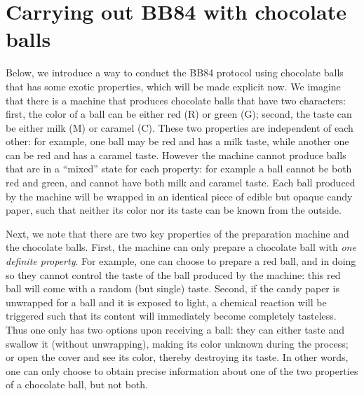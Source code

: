 \documentclass{article}
\begin{document}
\section{Carrying out BB84 with chocolate balls}
Below, we introduce a way to conduct the BB84 protocol using chocolate balls that has some exotic properties, which will be made explicit now. 
We imagine that there is a machine that produces chocolate balls that have two characters: first, the color of a ball can be either red (R) or green (G); second, the taste can be either milk (M) or caramel (C).
These two properties are independent of each other: for example, one ball may be red and has a milk taste, while another one can be red and has a caramel taste.
However the machine cannot produce balls that are in a ``mixed'' state for each property: for example a ball cannot be both red and green, and cannot have both milk and caramel taste.
Each ball produced by the machine will be wrapped in an identical piece of edible but opaque candy paper, such that neither its color nor its taste can be known from the outside.

Next, we note that there are two key properties of the preparation machine and the chocolate balls.
First, the machine can only prepare a chocolate ball with \textit{one definite property}.
For example, one can choose to prepare a red ball, and in doing so they cannot control the taste of the ball produced by the machine: this red ball will come with a random (but single) taste.
Second, if the candy paper is unwrapped for a ball and it is exposed to light, a chemical reaction will be triggered such that its content will immediately become completely tasteless.
Thus one only has two options upon receiving a ball: they can either taste and swallow it (without unwrapping), making its color unknown during the process; or open the cover and see its color, thereby destroying its taste.
In other words, one can only choose to obtain precise information about one of the two properties of a chocolate ball, but not both.
\end{document}
